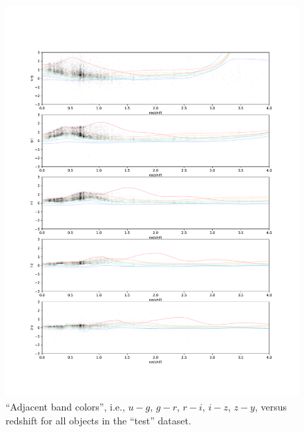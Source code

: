 \begin{figure}
    \centering
    \includegraphics[width=\linewidth]{figures/color_v_redshift.pdf}
    \caption{``Adjacent band colors'', i.e., $u-g$, $g-r$, $r-i$, $i-z$, $z-y$, versus redshift for all objects in the ``test'' dataset.}
    \label{fig:dp_color_v_redshift}
\end{figure}


